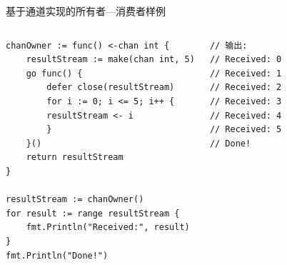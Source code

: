 \begin{frame}[fragile]{基于通道实现的所有者---消费者样例}
    \begin{columns}[t]
\begin{lstlisting}[xleftmargin=8pt]
chanOwner := func() <-chan int {
    resultStream := make(chan int, 5)
    go func() {
        defer close(resultStream)
        for i := 0; i <= 5; i++ {
        resultStream <- i
        }
    }()
    return resultStream
}
    
resultStream := chanOwner()
for result := range resultStream {
    fmt.Println("Received:", result)
}
fmt.Println("Done!")

\end{lstlisting}
\begin{lstlisting}[firstnumber=last,xleftmargin=8pt]
// 输出:
// Received: 0
// Received: 1
// Received: 2
// Received: 3
// Received: 4
// Received: 5
// Done!    
\end{lstlisting}
    \end{columns}
\end{frame}